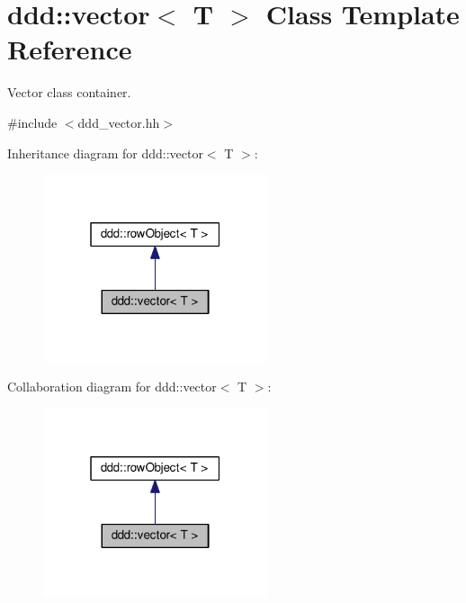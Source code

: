 \hypertarget{classddd_1_1vector}{}\section{ddd\+:\+:vector$<$ T $>$ Class Template Reference}
\label{classddd_1_1vector}


Vector class container.  




{\ttfamily \#include $<$ddd\+\_\+vector.\+hh$>$}



Inheritance diagram for ddd\+:\+:vector$<$ T $>$\+:\nopagebreak
\begin{figure}[H]
\begin{center}
\leavevmode
\includegraphics[width=187pt]{d6/df3/classddd_1_1vector__inherit__graph}
\end{center}
\end{figure}


Collaboration diagram for ddd\+:\+:vector$<$ T $>$\+:\nopagebreak
\begin{figure}[H]
\begin{center}
\leavevmode
\includegraphics[width=187pt]{d3/d01/classddd_1_1vector__coll__graph}
\end{center}
\end{figure}
